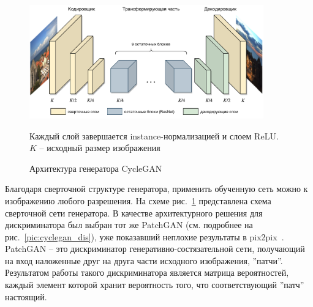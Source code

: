 \documentclass[11pt,a4paper]{extarticle}
\begin{document}
			\begin{figure}[ht]
				\centering
				\includegraphics[width=0.9\textwidth]{img/cyclegan_gen}
				\caption{Архитектура генератора CycleGAN}{
					\small{
						Каждый слой завершается instance-нормализацией и слоем ReLU.\\
						$K$ -- исходный размер изображения

					}
				}
				\label{pic:cyclegan_gen}
			\end{figure}
			\noindent
			Благодаря сверточной структуре генератора, применить обученную сеть можно к изображению любого разрешения.
			На схеме рис.~\ref{pic:cyclegan_gen} представлена схема сверточной сети генератора.
			В качестве архитектурного решения для дискриминатора был выбран тот же PatchGAN (см. подробнее на рис.~\ref{pic:cyclegan_dis}), уже показавший неплохие результаты в pix2pix~\cite{pix2pix}.
			PatchGAN -- это дискриминатор генеративно-состязательной сети, получающий на вход наложенные друг на друга части исходного изображения, ''патчи''.
			Результатом работы такого дискриминатора является матрица вероятностей, каждый элемент которой хранит вероятность того, что соответствующий ''патч'' настоящий.
			
\end{document}
